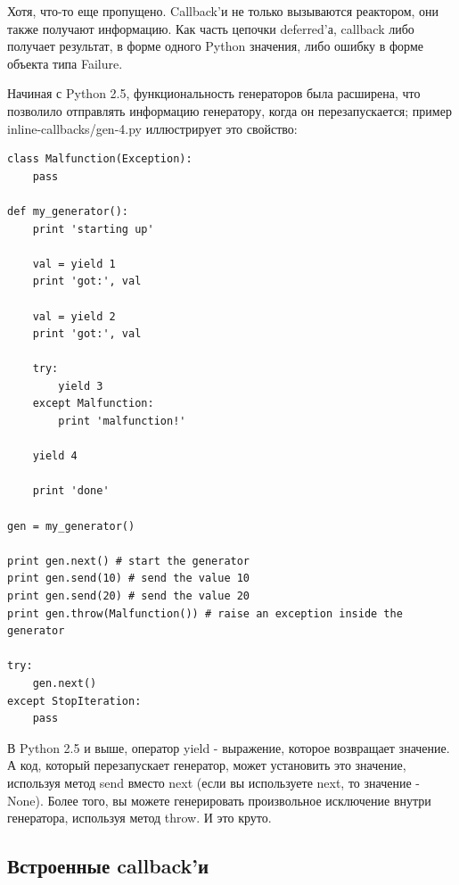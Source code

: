 Хотя, что-то еще пропущено. Callback'и не только вызываются реактором, 
они также получают информацию. Как часть цепочки deferred'а, callback 
либо получает результат, в форме одного Python значения, либо ошибку в 
форме объекта типа Failure. 


Начиная с Python 2.5, функциональность генераторов была 
расширена, что позволило отправлять информацию 
генератору, когда он перезапускается; пример 
inline-callbacks/gen-4.py иллюстрирует это свойство:


\begin{scriptsize}\begin{verbatim}
class Malfunction(Exception):
    pass

def my_generator():
    print 'starting up'

    val = yield 1
    print 'got:', val

    val = yield 2
    print 'got:', val

    try:
        yield 3
    except Malfunction:
        print 'malfunction!'

    yield 4

    print 'done'

gen = my_generator()

print gen.next() # start the generator
print gen.send(10) # send the value 10
print gen.send(20) # send the value 20
print gen.throw(Malfunction()) # raise an exception inside the generator

try:
    gen.next()
except StopIteration:
    pass
\end{verbatim}\end{scriptsize}


В Python 2.5 и выше, оператор yield - выражение, 
которое возвращает значение. А код, который перезапускает генератор, 
может установить это значение, используя метод send вместо next (если 
вы используете next, то значение - None). Более того, 
вы можете генерировать произвольное 
исключение внутри генератора, используя метод throw. И это круто.


\subsection{Встроенные callback'и}



